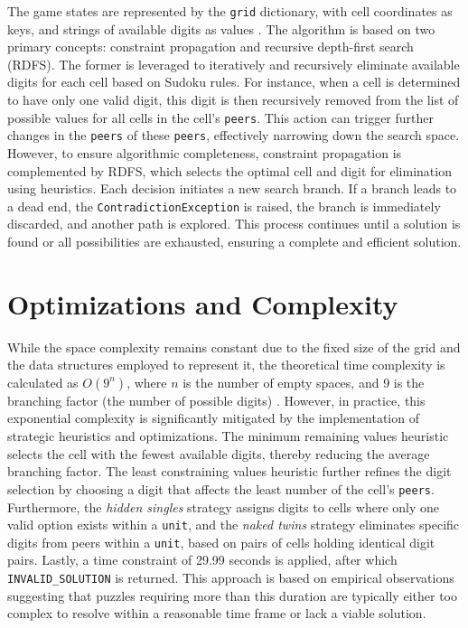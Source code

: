 \documentclass[12pt]{article}
\begin{document}
The game states are represented by the \texttt{grid} dictionary, with cell
coordinates as keys, and strings of available digits as values \cite{norvig}.
The algorithm is based on two primary concepts: constraint propagation and
recursive depth-first search (RDFS). The former is leveraged to iteratively and
recursively eliminate available digits for each cell based on Sudoku rules. For
instance, when a cell is determined to have only one valid digit, this digit is
then recursively removed from the list of possible values for all cells in the
cell's \texttt{peers}. This action can trigger further changes in the
\texttt{peers} of these \texttt{peers}, effectively narrowing down the search
space. However, to ensure algorithmic completeness, constraint propagation is
complemented by RDFS, which selects the optimal cell and digit for elimination
using heuristics. Each decision initiates a new search branch. If a branch
leads to a dead end, the \texttt{ContradictionException} is raised, the branch is
immediately discarded, and another path is explored. This process continues
until a solution is found or all possibilities are exhausted, ensuring a
complete and efficient solution.

\section{Optimizations and Complexity}
\label{complexity}

While the space complexity remains constant due to the fixed size of the grid
and the data structures employed to represent it, the theoretical time
complexity is calculated as \( O(9^n) \), where \( n \) is the number of empty
spaces, and 9 is the branching factor (the number of possible digits)
\cite{bigO}. However, in practice, this exponential complexity is significantly
mitigated by the implementation of strategic heuristics and optimizations. The
minimum remaining values heuristic selects the cell with the fewest available
digits, thereby reducing the average branching factor. The least constraining
values heuristic further refines the digit selection by choosing a digit that
affects the least number of the cell's \texttt{peers}. Furthermore, the
\textit{hidden singles} strategy assigns digits to cells where only one valid
option exists within a \texttt{unit}, and the \textit{naked twins} strategy
eliminates specific digits from peers within a \texttt{unit}, based on pairs of
cells holding identical digit pairs. Lastly, a time constraint of 29.99 seconds
is applied, after which \texttt{INVALID\_SOLUTION} is returned. This approach
is based on empirical observations suggesting that puzzles requiring more than
this duration are typically either too complex to resolve within a reasonable
time frame or lack a viable solution.
\end{document}
